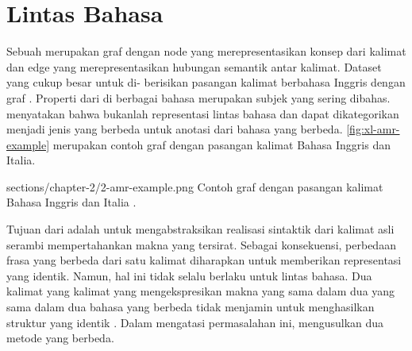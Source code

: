 \section{\amrparsing{} Lintas Bahasa}

Sebuah \AMR{} merupakan graf dengan node yang merepresentasikan konsep dari kalimat dan edge yang merepresentasikan hubungan semantik antar kalimat.
Dataset \AMR{} yang cukup besar untuk di- berisikan pasangan kalimat berbahasa Inggris dengan graf \AMR{}.
Properti \crosslingual{} dari \AMR{} di berbagai bahasa merupakan subjek yang sering dibahas.
\textcite{banarescu2013} menyatakan bahwa \AMR{} bukanlah representasi lintas bahasa dan dapat dikategorikan menjadi jenis \AMR{} yang berbeda untuk anotasi dari bahasa yang berbeda.
\cref{fig:xl-amr-example} merupakan contoh graf \AMR{} dengan pasangan kalimat Bahasa Inggris dan Italia.

  {sections/chapter-2/2-amr-example.png}
  {Contoh graf \AMR{} dengan pasangan kalimat Bahasa Inggris dan Italia .}

Tujuan dari \AMR{} adalah untuk mengabstraksikan realisasi sintaktik dari kalimat asli serambi mempertahankan makna yang tersirat.
Sebagai konsekuensi, perbedaan frasa yang berbeda dari satu kalimat diharapkan untuk memberikan representasi \AMR{} yang identik.
Namun, hal ini tidak selalu berlaku untuk lintas bahasa.
Dua kalimat yang kalimat yang mengekspresikan makna yang sama dalam dua yang sama dalam dua bahasa yang berbeda tidak menjamin untuk menghasilkan struktur \AMR{} yang identik .
Dalam mengatasi permasalahan ini, \textcite{damonte2018} mengusulkan dua metode yang berbeda.

